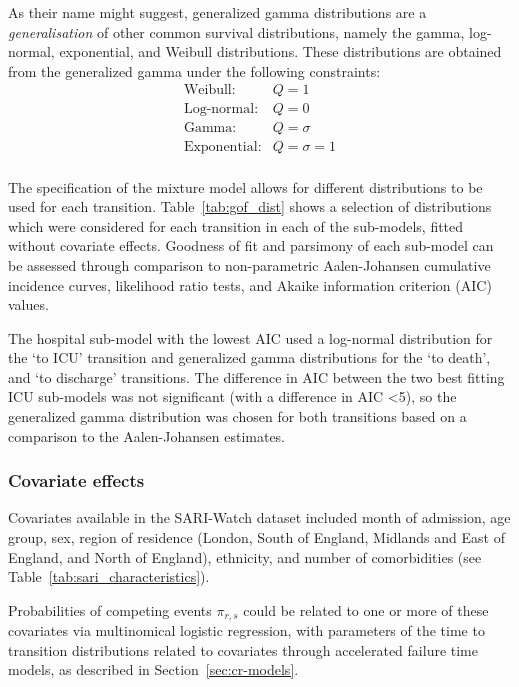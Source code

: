 As their name might suggest, generalized gamma distributions are a \textit{generalisation} of other common survival distributions, namely the gamma, log-normal, exponential, and Weibull distributions. These distributions are obtained from the generalized gamma under the following constraints:
%
\[
    \begin{array}{rl}
        \text{Weibull} :     & Q = 1          \\
        \text{Log-normal} :  & Q = 0          \\
        \text{Gamma} :       & Q = \sigma     \\
        \text{Exponential} : & Q = \sigma = 1 \\
    \end{array}
\]

The specification of the mixture model allows for different distributions to be used for each transition. Table~\ref{tab:gof_dist} shows a selection of distributions which were considered for each transition in each of the sub-models, fitted without covariate effects. Goodness of fit and parsimony of each sub-model can be assessed through comparison to non-parametric Aalen-Johansen cumulative incidence curves, likelihood ratio tests, and Akaike information criterion (AIC) values. %



The hospital sub-model with the lowest AIC used a log-normal distribution for the `to ICU' transition and generalized gamma distributions for the `to death', and `to discharge' transitions. The difference in AIC between the two best fitting ICU sub-models was not significant (with a difference in AIC <5), so the generalized gamma distribution was chosen for both transitions based on a comparison to the Aalen-Johansen estimates.

\subsubsection{Covariate effects}

Covariates available in the SARI-Watch dataset included month of admission, age group, sex, region of residence (London, South of England, Midlands and East of England, and North of England), ethnicity, and number of comorbidities (see Table~\ref{tab:sari_characteristics}).

Probabilities of competing events $\pi_{r,s}$ could be related to one or more of these covariates via multinomical logistic regression, with parameters of the time to transition distributions related to covariates through accelerated failure time models, as described in Section~\ref{sec:cr-models}.

